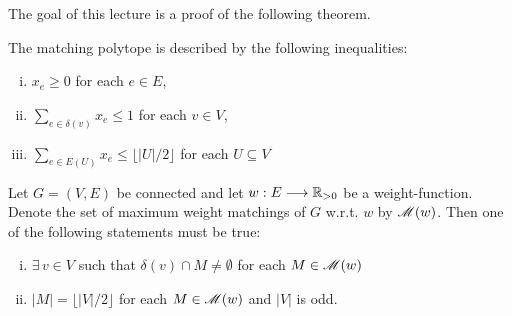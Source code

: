 The goal of this lecture is a proof of the following theorem. 

\begin{theorem}[Edmonds 65]
\label{po:thr:18}
  The matching polytope is described by the following inequalities:
  \begin{enumerate}[i)]
  \item $x_e \geq0$ for each $e \in E$,
  \item $\sum_{e \in \delta(v)} x_e \leq 1$ for each $v \in V$,
  \item $\sum_{e \in E(U)} x_e \leq \lfloor |U|  /2 \rfloor$ for each $U\subseteq V$
  \end{enumerate}
\end{theorem}


\begin{lemma}
\label{po:lem:11}
  Let $G=(V,E)$ be connected and 
  let $w:E\longrightarrow\mathbb{R}_{>0}$ be a weight-function.  Denote the set of maximum
  weight matchings of $G$ w.r.t. $w$ by $\mathscr{M}(w)$. Then one of the following statements
  must be true:
  \begin{enumerate}[i)]
  \item $\exists\,v \in V$ such that $\delta(v) \cap M \neq \emptyset$ for each $M \in \mathscr{M}(w)$
  \item $|M| =   \lfloor|V| /2\rfloor$ for each $M \in \mathscr{M}(w)$ and $|V|$ is odd.
  \end{enumerate}
\end{lemma}


